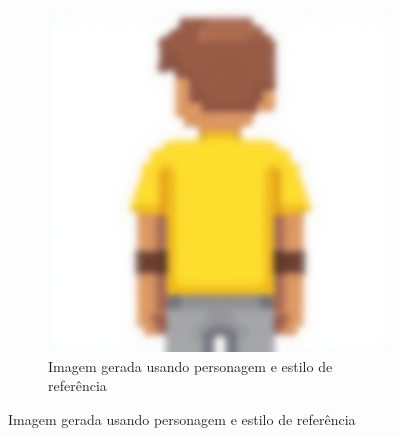 \begin{figure}[htbp]
    \begin{subfigure}{0.45\linewidth}
        \includegraphics[width=1\linewidth]{figs/cgDream/res_char_FluxFast_filtro2.png}
        \caption{\small Imagem gerada usando personagem e estilo de referência}
        \label{fig:cgDreamFluxComEstilo}
    \end{subfigure}
\end{figure}

